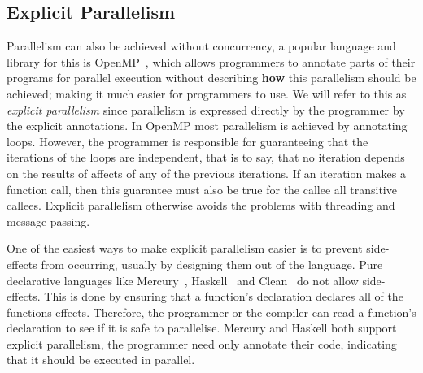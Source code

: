 \subsection{Explicit Parallelism}
\label{sec:back_par_explicit}

Parallelism can also be achieved without concurrency,
a popular language and library for this is OpenMP~\citep{openmp},
which allows programmers to annotate parts of their programs for parallel
execution without describing \textbf{how} this parallelism should be achieved;
making it much easier for programmers to use.
We will refer to this as \emph{explicit parallelism}
since parallelism is expressed directly by the programmer by the explicit
annotations.
In OpenMP most parallelism is achieved by annotating loops.
However,
the programmer is responsible for guaranteeing that the iterations of the loops
are independent,
that is to say, that no iteration depends on the results of affects of any of
the previous iterations.
If an iteration makes a function call, then this guarantee must also be true for
the callee all transitive callees.
Explicit parallelism otherwise avoids the problems with threading and message
passing.

One of the easiest ways to make explicit parallelism easier is to prevent
side-effects from occurring, usually by designing them out of the language.
Pure declarative languages like Mercury~\citep{mercury_jlp},
Haskell~\citep{haskell98} and Clean~\citep{1991:concurrent-clean} do not
allow side-effects.
This is done by ensuring that a function's declaration declares all of the
functions effects.
Therefore,
the programmer or the compiler can read a function's declaration to see if it
is safe to parallelise.
Mercury and Haskell both support explicit parallelism,
the programmer need only annotate their code, indicating that it should be
executed in parallel.

